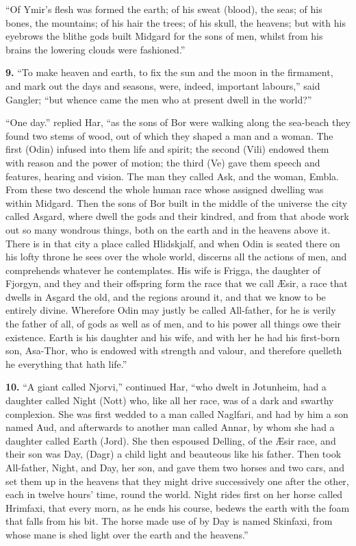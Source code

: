 ``Of Ymir's flesh was formed the earth; of his sweat (blood), the seas;
of his bones, the mountains; of his hair the trees; of his skull, the
heavens; but with his eyebrows the blithe gods built Midgard for the
sons of men, whilst from his brains the lowering clouds were
fashioned.''


\textbf{9.} ``To make heaven and earth, to fix the sun and the moon in the
firmament, and mark out the days and seasons, were, indeed, important
labours,'' said Gangler; ``but whence came the men who at present dwell
in the world?''

``One day.'' replied Har, ``as the sons of Bor were walking along the
sea-beach they found two stems of wood, out of which they shaped a man
and a woman. The first (Odin) infused into them life and spirit; the
second (Vili) endowed them with reason and the power of motion; the
third (Ve) gave them speech and features, hearing and vision. The man
they called Ask, and the woman, Embla. From these two descend the
whole human race whose assigned dwelling was within Midgard. Then the
sons of Bor built in the middle of the universe the city called
Asgard, where dwell the gods and their kindred, and from that abode
work out so many wondrous things, both on the earth and in the heavens
above it. There is in that city a place called Hlidskjalf, and when
Odin is seated there on his lofty throne he sees over the whole world,
discerns all the actions of men, and comprehends whatever he
contemplates. His wife is Frigga, the daughter of Fjorgyn, and they
and their offspring form the race that we call Æsir, a race that
dwells in Asgard the old, and the regions around it, and that we know
to be entirely divine. Wherefore Odin may justly be called All-father,
for he is verily the father of all, of gods as well as of men, and to
his power all things owe their existence. Earth is his daughter and
his wife, and with her he had his first-born son, Asa-Thor, who is
endowed with strength and valour, and therefore quelleth he everything
that hath life.''


\textbf{10.} ``A giant called Njorvi,'' continued Har, ``who dwelt in Jotunheim,
had a daughter called Night (Nott) who, like all her race, was of a
dark and swarthy complexion. She was first wedded to a man called
Naglfari, and had by him a son named Aud, and afterwards to another
man called Annar, by whom she had a daughter called Earth (Jord). She
then espoused Delling, of the Æsir race, and their son was Day, (Dagr)
a child light and beauteous like his father. Then took All-father,
Night, and Day, her son, and gave them two horses and two cars, and
set them up in the heavens that they might drive successively one
after the other, each in twelve hours' time, round the world. Night
rides first on her horse called Hrimfaxi, that every morn, as he ends
his course, bedews the earth with the foam that falls from his bit.
The horse made use of by Day is named Skinfaxi, from whose mane is
shed light over the earth and the heavens.''

